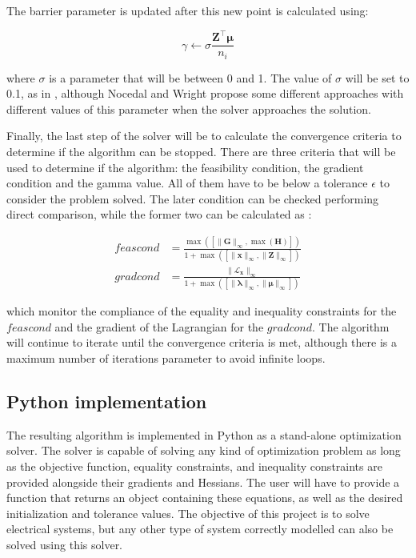 The barrier parameter is updated after this new point is calculated using:

\begin{equation}
    \gamma \leftarrow \sigma\frac{\bm{Z}^\top \bm{\mu}}{n_i}
    \label{gamma_update}
\end{equation}

where $\sigma$ is a parameter that will be between 0 and 1. The value of $\sigma$ will be set to 0.1, as in \cite{zimmerman2016mips}, although Nocedal and Wright  %
propose some different approaches with different values of this parameter when the solver approaches the solution. 

Finally, the last step of the solver will be to calculate the convergence criteria to determine if the algorithm can be stopped.
There are three criteria that will be used to determine if the algorithm: the feasibility condition, the gradient condition and the gamma value. All of them have 
to be below a tolerance $\epsilon$ to consider the problem solved. The later condition can be checked performing direct comparison, while the former two can be calculated as \cite{wang2007computational}:

\begin{equation}
    \begin{split}
    feascond &= \frac{\max \left( \left[ \lVert \mathbf{G} \rVert_{\infty}, \max(\bm{H}) \right] \right)}{1 + \max \left( \left[ \lVert \mathbf{x} \rVert_{\infty},\lVert \mathbf{Z} \rVert_{\infty} \right] \right)} \\
    gradcond &= \frac{\lVert \mathbf{\mathcal{L}}_{\mathbf{x}} \rVert_{\infty}}{1 + \max \left( \left[ \lVert \mathbf{\lambda} \rVert_{\infty}, \lVert \mathbf{\mu} \rVert_{\infty} \right] \right)}
    \end{split}
    \label{eq:conv_cond}
\end{equation}

which monitor the compliance of the equality and inequality constraints for the $feascond$ and the gradient of the Lagrangian for the $gradcond$. The algorithm will continue to iterate until the convergence criteria is met, 
although there is a maximum number of iterations parameter to avoid infinite loops.  


\subsection{Python implementation}

The resulting algorithm is implemented in Python as a stand-alone optimization solver. The solver is capable of solving any kind of optimization problem as long as 
the objective function, equality constraints, and inequality constraints are provided alongside their gradients and Hessians. The user will have to provide
a function that returns an object containing these equations, as well as the desired initialization and tolerance values. The objective of this project is to solve electrical systems, but
any other type of system correctly modelled can also be solved using this solver.

